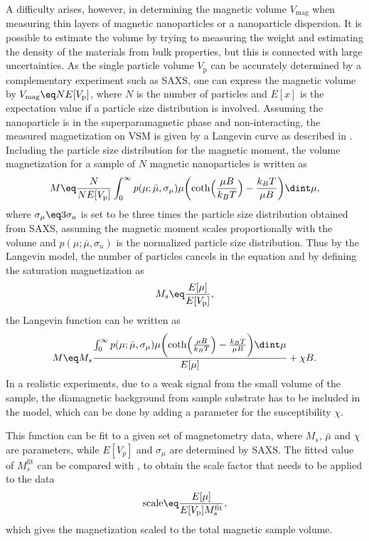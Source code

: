 \documentclass[\main/dresen_thesis.tex]{subfiles}
\begin{document}
    A difficulty arises, however, in determining the magnetic volume $V_\mathrm{mag}$ when measuring thin layers of magnetic nanoparticles or a nanoparticle dispersion.
    It is possible to estimate the volume by trying to measuring the weight and estimating the density of the materials from bulk properties, but this is connected with large uncertainties.
    As the single particle volume $V_\mathrm{p}$ can be accurately determined by a complementary experiment such as SAXS, one can express the magnetic volume by $V_\mathrm{mag} \eq N E[ V_\mathrm{p} ]$, where $N$ is the number of particles and $E[x]$ is the expectation value if a particle size distribution is involved.
    Assuming the nanoparticle is in the superparamagnetic phase and non-interacting, the measured magnetization on VSM is given by a Langevin curve as described in .
    Including the particle size distribution for the magnetic moment, the volume magnetization for a sample of $N$ magnetic nanoparticles is written as
    \begin{align}
      M \eq \frac{N}{N E[ V_\mathrm{p} ]}
      \int_{0}^{\infty} p(\mu; \bar{\mu}, \sigma_\mu) \mu \biggl( \coth\Bigl(\frac{\mu B}{k_B T} \Bigr) - \frac{k_B T}{\mu B} \biggr) \dint \mu,
    \end{align}
    where $\sigma_\mu \eq 3 \sigma_a$ is set to be three times the particle size distribution obtained from SAXS, assuming the magnetic moment scales proportionally with the volume and $p(\mu; \bar{\mu}, \sigma_u)$ is the normalized particle size distribution.
    Thus by the Langevin model, the number of particles cancels in the equation and by defining the saturation magnetization as
    \begin{align}
      \label{eq:methods:vsm:MsDefinition}
      M_s \eq \frac{E[\mu]}{E[V_\mathrm{p}]},
    \end{align}
    the Langevin function can be written as 
    \begin{align}
      \label{eq:methods:vsm:scaleMagnetization}
      M \eq M_s
      \frac{\int_{0}^{\infty} p(\mu; \bar{\mu}, \sigma_\mu) \mu \biggl( \coth\Bigl(\frac{\mu B}{k_B T} \Bigr) - \frac{k_B T}{\mu B} \biggr) \dint \mu}{E[\mu]} + \chi B.
    \end{align}
    In a realistic experiments, due to a weak signal from the small volume of the sample, the diamagnetic background from \ie sample substrate has to be included in the model, which can be done by adding a parameter for the susceptibility $\chi$.

    This function can be fit to a given set of magnetometry data, where $M_s$, $\bar{\mu}$ and $\chi$ are parameters, while $E[V_p]$ and $\sigma_{\mu}$ are determined by SAXS.
    The fitted value of $M_s^\mathrm{fit}$ can be compared with , to obtain the scale factor that needs to be applied to the data
    \begin{align}
      \mathrm{scale} \eq \frac{E[\mu]}{E[V_\mathrm{p}] M_s^\mathrm{fit}},
    \end{align}
    which gives the magnetization scaled to the total magnetic sample volume.
\end{document}
